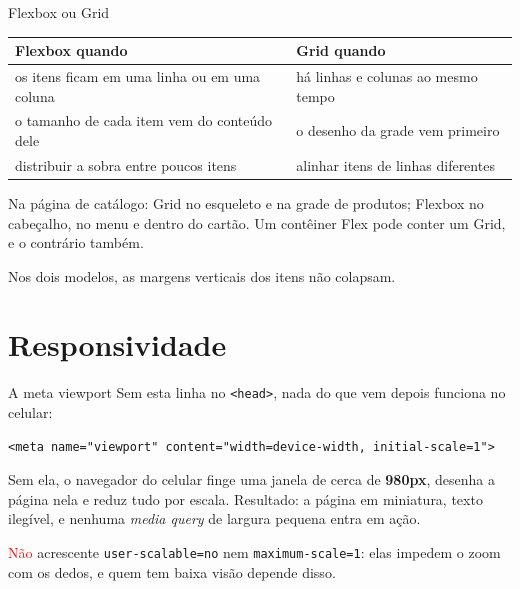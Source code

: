 \documentclass{beamer}
\newcommand{\tcr}[1]{\textcolor{red}{#1}}
\begin{document}
\begin{frame}{Flexbox ou Grid}
	\begin{center}
		\begin{tabular}{p{4.2cm}p{4.8cm}}
			\toprule
			\textbf{Flexbox quando}                      & \textbf{Grid quando}                                  \\
			\midrule
			os itens ficam em uma linha ou em uma coluna & há linhas e colunas ao mesmo tempo                    \\
			\addlinespace
			o tamanho de cada item vem do conteúdo dele  & o desenho da grade vem primeiro                       \\
			\addlinespace
			distribuir a sobra entre poucos itens        & alinhar itens de linhas diferentes                    \\
			\bottomrule
		\end{tabular}
	\end{center}

	\vspace{0.4cm}
	Na página de catálogo: Grid no esqueleto e na grade de produtos; Flexbox no
	cabeçalho, no menu e dentro do cartão. Um contêiner Flex pode conter um Grid,
	e o contrário também.

	\vspace{0.2cm}
	Nos dois modelos, as margens verticais dos itens não colapsam.
\end{frame}

\section{Responsividade}

\begin{frame}[fragile]{A meta viewport}
	Sem esta linha no \texttt{<head>}, nada do que vem depois funciona no celular:

	\begin{verbatim}
<meta name="viewport" content="width=device-width, initial-scale=1">
  \end{verbatim}

	\vspace{0.3cm}
	Sem ela, o navegador do celular finge uma janela de cerca de \textbf{980px},
	desenha a página nela e reduz tudo por escala. Resultado: a página em
	miniatura, texto ilegível, e nenhuma \emph{media query} de largura pequena
	entra em ação.

	\vspace{0.3cm}
	\tcr{Não} acrescente \texttt{user-scalable=no} nem \texttt{maximum-scale=1}:
	elas impedem o zoom com os dedos, e quem tem baixa visão depende disso.
\end{frame}
\end{document}
